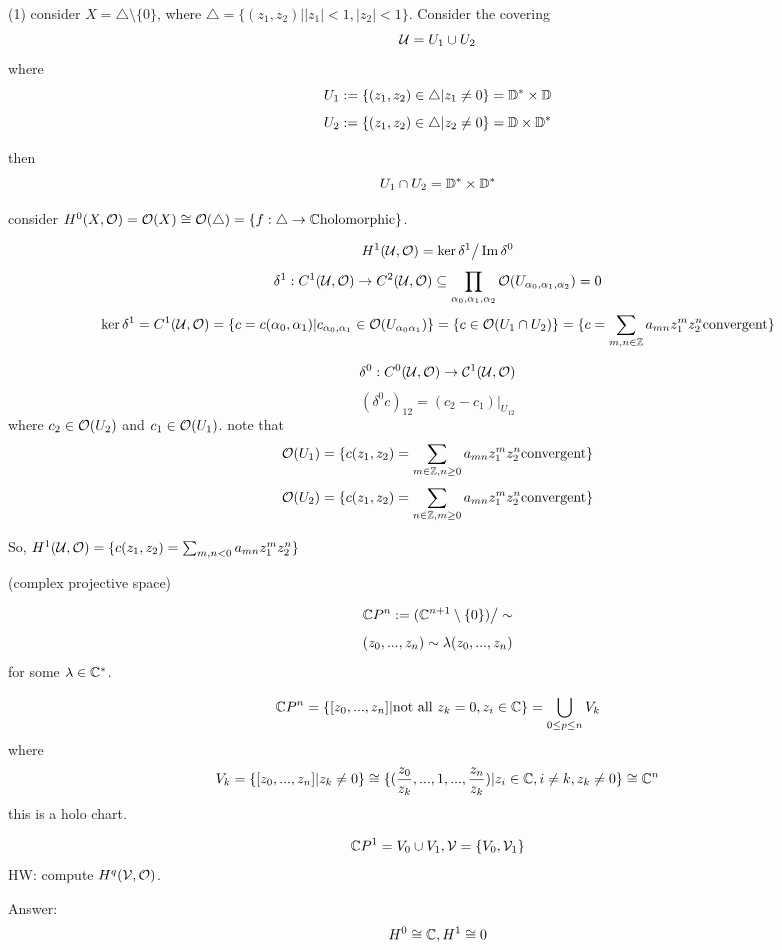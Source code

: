 \begin{example}
(1) consider $X=\triangle\setminus\{0\}$, where $\triangle=
\{(z_1,z_2)||z_1|<1,|z_2|<1\}$. Consider the covering
$$\mathcal{U}=U_1\cup U_2$$
where
$$U_1:=\{(z_1,z_2)\in\triangle|z_1\neq 0\}=\mathbb{D}^*\times\mathbb{D}$$
$$U_2:=\{(z_1,z_2)\in\triangle|z_2\neq 0\}=\mathbb{D}\times\mathbb{D}^*$$

then
$$U_1\cap U_2=\mathbb{D}^*\times\mathbb{D}^*$$

consider $H^0(X,\mathcal{O})=\mathcal{O}(X)\cong\mathcal{O}(\triangle)
=\{f:\triangle\to\mathbb{C}\text{holomorphic}\}$.

$$H^1(\mathcal{U},\mathcal{O})=\ker\delta^1\big/\operatorname{Im}\delta^0$$
$$\delta^1:C^1(\mathcal{U},\mathcal{O})\to C^2(\mathcal{U},\mathcal{O})\subseteq
\prod_{\alpha_0,\alpha_1,\alpha_2}\mathcal{O}(U_{\alpha_0,\alpha_1,\alpha_2})=0$$
$$\ker\delta^1=
C^1(\mathcal{U},\mathcal{O})=\{c=c(\alpha_0,\alpha_1)|c_{\alpha_0,\alpha_1}\in\mathcal{O}(U_{\alpha_0\alpha_1})\}
=\{c\in\mathcal{O}(U_1\cap U_2)\}=\{c=\sum_{m,n\in\mathbb{Z}}a_{mn}z_1^mz_2^n\text{convergent}\}$$

$$\delta^0:C^0(\mathcal{U},\mathcal{O})\to\mathcal{C}^1(\mathcal{U},\mathcal{O})$$
$$(\delta^0c)_{12}=(c_2-c_1)|_{U_{12}}$$
where $c_2\in\mathcal{O}(U_2)$ and $c_1\in\mathcal{O}(U_1)$.
note that
$$\mathcal{O}(U_1)=\{c(z_1,z_2)=\sum_{m\in\mathbb{Z},n\geq 0}a_{mn}z_1^mz_2^n\text{convergent}\}$$
$$\mathcal{O}(U_2)=\{c(z_1,z_2)=\sum_{n\in\mathbb{Z},m\geq 0}a_{mn}z_1^mz_2^n\text{convergent}\}$$

So, $H^1(\mathcal{U},\mathcal{O})=
\{c(z_1,z_2)=\sum_{m,n<0}a_{mn}z_1^mz_2^n\}$
\end{example}

\begin{example}(complex projective space)

$$\mathbb{C} P^n:=(\mathbb{C}^{n+1}\setminus\{0\})\big/\sim$$
$$(z_0,...,z_n)\sim\lambda(z_0,...,z_n)$$
for some $\lambda\in\mathbb{C}^*$.

$$\mathbb{C} P^n=\{[z_0,...,z_n]|\text{not all $z_k=0$},z_i\in\mathbb{C}\}
=\bigcup_{0\leq p\leq n}V_k$$
where
$$V_k=\{[z_0,...,z_n]|z_k\neq 0\}
\cong \{(\frac{z_0}{z_k},...,1,...,\frac{z_n}{z_k})|
z_i\in\mathbb{C},i\neq k, z_k\neq 0\}\cong \mathbb{C}^n$$
this is a holo chart.

$$\mathbb{C} P^1=V_0\cup V_1,\mathcal{V}=\{V_0,\mathcal{V}_1\}$$
HW: compute $H^q(\mathcal{V},\mathcal{O})$.

Answer:
$$H^0\cong\mathbb{C},H^1\cong 0$$
\end{example}



